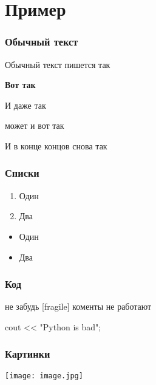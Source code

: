 \section{Пример}


\begin{frame}
	\frametitle{Обычный текст}
    Обычный текст пишется так

    \textbf{Вот так}

    \Huge 

    И даже так

    \tiny может и вот так

    \normalsize
    И в конце концов снова так
\end{frame}


\begin{frame}
	\frametitle{Списки}
    \begin{enumerate}
        \item Один
        \item Два
    \end{enumerate}

    \begin{itemize}
        \item Один
        \item Два
    \end{itemize}
\end{frame}


\begin{frame}[fragile]
	\frametitle{Код}
    не забудь [fragile]
    коменты не работают
\begin{cpp}
cout << "Python is bad\n";
\end{cpp}
	
\end{frame}


\begin{frame}
	\frametitle{Картинки}
    \center\texttt{[image: image.jpg]}

\end{frame}



